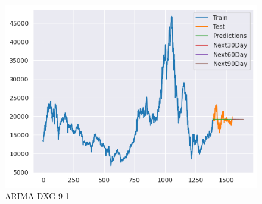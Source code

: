 \documentclass[conference]{IEEEtran}
\begin{document}
\begin{figure}[htbp]
\begin{minipage}{0.23\textwidth}
    \includegraphics[width=1\textwidth]{experiment/arima/DXG/9 _ 1/9_1_train_test_DXG_ARIMA_plot.png}
    \caption{ARIMA DXG 9-1}
    \label{fig:nvl_histogram}
    \end{minipage}


\end{figure}
\end{document}
